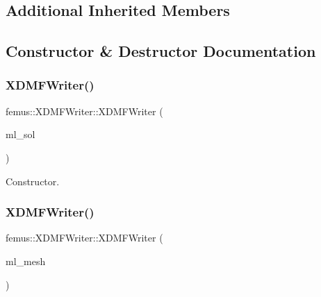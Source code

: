 \subsection*{Additional Inherited Members}


\subsection{Constructor \& Destructor Documentation}
\mbox{\label{classfemus_1_1_x_d_m_f_writer_aec251ee0511703c8fa147a6688cf2487}} 
\subsubsection{\texorpdfstring{X\+D\+M\+F\+Writer()}{XDMFWriter()}\hspace{0.1cm}{\footnotesize\ttfamily [1/2]}}
{\footnotesize\ttfamily femus\+::\+X\+D\+M\+F\+Writer\+::\+X\+D\+M\+F\+Writer (\begin{DoxyParamCaption}\item[{\mbox{\hyperlink{classfemus_1_1_multi_level_solution}{Multi\+Level\+Solution}} $\ast$}]{ml\+\_\+sol }\end{DoxyParamCaption})}

Constructor. \mbox{\label{classfemus_1_1_x_d_m_f_writer_a09aa7a64477a92db7787f321fa625b53}} 
\subsubsection{\texorpdfstring{X\+D\+M\+F\+Writer()}{XDMFWriter()}\hspace{0.1cm}{\footnotesize\ttfamily [2/2]}}
{\footnotesize\ttfamily femus\+::\+X\+D\+M\+F\+Writer\+::\+X\+D\+M\+F\+Writer (\begin{DoxyParamCaption}\item[{\mbox{\hyperlink{classfemus_1_1_multi_level_mesh}{Multi\+Level\+Mesh}} $\ast$}]{ml\+\_\+mesh }\end{DoxyParamCaption})}

